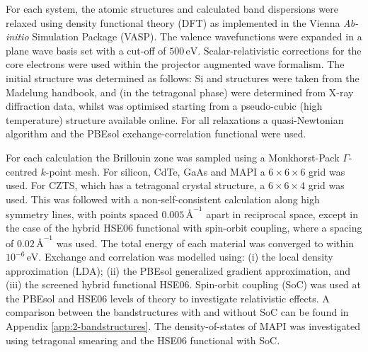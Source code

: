 For each system, the atomic structures and calculated band dispersions were relaxed using density functional theory (DFT) as implemented in the Vienna \textit{Ab-initio} Simulation Package (\textsc{VASP}).\autocite{Kresse1996} The valence wavefunctions were expanded in a plane wave basis set with a cut-off of $500\,\mathrm{eV}$. Scalar-relativistic corrections for the core electrons were used within the projector augmented wave formalism.\autocite{Blochl1994}
The initial structure was determined as follows: Si and  structures were taken from the Madelung handbook,\autocite{Madelung2004}  \autocite{Rabadanov2001} and \autocite{Lafond2014} (in the tetragonal phase) were determined from X-ray diffraction data, whilst  was optimised starting from a pseudo-cubic (high temperature) structure available online.\autocite{WMD} For all relaxations a quasi-Newtonian algorithm and the PBEsol exchange-correlation functional were used.

For each calculation the Brillouin zone was sampled using a Monkhorst-Pack $\Gamma$-centred $k$-point mesh. For silicon, CdTe, GaAs and MAPI a $6\!\times\!6\!\times\!6$ grid was used. For CZTS, which has a tetragonal crystal structure, a $6\!\times\!6\!\times\!4$ grid was used. This was followed with a non-self-consistent calculation along high symmetry lines\autocite{Setyawan2010}, with points spaced $0.005\,\text{\AA}^{-1}$ apart in reciprocal space, except in the case of the hybrid HSE06 functional with spin-orbit coupling, where a spacing of $0.02\,\text{\AA}^{-1}$ was used. The total energy of each material was converged to within $10^{-6}\,\mathrm{eV}$. Exchange and correlation was modelled using: (i) the local density approximation (LDA); (ii) the PBEsol\autocite{Perdew2008} generalized gradient approximation, and (iii) the screened hybrid functional HSE06.\autocite{Heyd2003} Spin-orbit coupling (SoC) was used at the PBEsol and HSE06 levels of theory to investigate relativistic effects. A comparison between the bandstructures with and without SoC can be found in Appendix \ref{app:2-bandstructures}.
The density-of-states of MAPI was investigated using tetragonal smearing and the HSE06 functional with SoC. 

